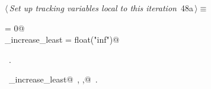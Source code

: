 \documentclass[11.5pt]{report}
\begin{document}
\begin{flushleft} \small\label{scrap70}\raggedright\small
{} $\langle\,${\itshape Set up tracking variables local to this iteration}\nobreak\ {\footnotesize {48a}}$\,\rangle\equiv$
\vspace{-1ex}
\begin{list}{}{} \item
\mbox{}\verb@ibest                = 0@\\
\mbox{}\verb@delta_increase_least = float("inf")@\\
\mbox{}\verb@@{\NWsep}
\end{list}
\vspace{-1.5ex}
\footnotesize
\begin{list}{}{\setlength{\itemsep}{-\parsep}\setlength{\itemindent}{-\leftmargin}}
\item \NWtxtMacroRefIn\ .
\item \NWtxtIdentsDefed\nobreak\  \verb@delta_increase_least@\nobreak\ , \verb@ibest,@\nobreak\ .
\item{}
\end{list}
\vspace{4ex}
\end{flushleft}

\vspace{-0.8cm}\newchunk 
\end{document}
